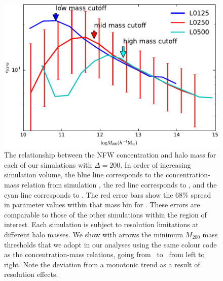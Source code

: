 \documentclass[usenatbib,fleqn]{mnras}
\begin{document}
\begin{figure}
\centering
\includegraphics[width=\columnwidth]{masscut_cNFW_d200.pdf}
\caption{
The relationship between the NFW concentration and halo mass for each of our simulations with $\Delta =200$. 
In order of increasing simulation volume, the blue line corresponds to the concentration-mass relation from simulation 
\simA, the red line corresponds to \simB, and the cyan line corresponds to \simC. The red error bars show the 68\% spread in
parameter values within that mass bin for \simB. These errors are comparable to those of the other simulations
within the region of interest.
Each simulation is subject to resolution limitations at different halo masses. We show with arrows 
the minimum $M_{200}$ mass thresholds that we adopt in our analyses using the same colour code as 
the concentration-mass relations, going from \simA \ to \simC \ from left to right. Note the deviation from a monotonic trend as a result of resolution effects.
}
\label{fig:cnfwrelation}
\end{figure}
\end{document}
